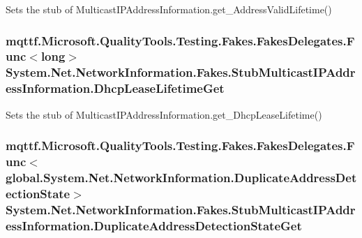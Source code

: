 Sets the stub of Multicast\-I\-P\-Address\-Information.\-get\-\_\-\-Address\-Valid\-Lifetime()

\hypertarget{class_system_1_1_net_1_1_network_information_1_1_fakes_1_1_stub_multicast_i_p_address_information_acd465f43a526ba33b00d37da8e61f489}{
\subsubsection[{Dhcp\-Lease\-Lifetime\-Get}]{\setlength{\rightskip}{0pt plus 5cm}mqttf.\-Microsoft.\-Quality\-Tools.\-Testing.\-Fakes.\-Fakes\-Delegates.\-Func$<$long$>$ System.\-Net.\-Network\-Information.\-Fakes.\-Stub\-Multicast\-I\-P\-Address\-Information.\-Dhcp\-Lease\-Lifetime\-Get}}\label{class_system_1_1_net_1_1_network_information_1_1_fakes_1_1_stub_multicast_i_p_address_information_acd465f43a526ba33b00d37da8e61f489}


Sets the stub of Multicast\-I\-P\-Address\-Information.\-get\-\_\-\-Dhcp\-Lease\-Lifetime()

\hypertarget{class_system_1_1_net_1_1_network_information_1_1_fakes_1_1_stub_multicast_i_p_address_information_acc9622c5e5fac32148960259eaad26f5}{
\subsubsection[{Duplicate\-Address\-Detection\-State\-Get}]{\setlength{\rightskip}{0pt plus 5cm}mqttf.\-Microsoft.\-Quality\-Tools.\-Testing.\-Fakes.\-Fakes\-Delegates.\-Func$<$global.\-System.\-Net.\-Network\-Information.\-Duplicate\-Address\-Detection\-State$>$ System.\-Net.\-Network\-Information.\-Fakes.\-Stub\-Multicast\-I\-P\-Address\-Information.\-Duplicate\-Address\-Detection\-State\-Get}}\label{class_system_1_1_net_1_1_network_information_1_1_fakes_1_1_stub_multicast_i_p_address_information_acc9622c5e5fac32148960259eaad26f5}



